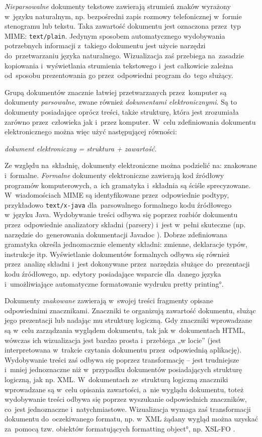 \emph{Nieparsowalne} dokumenty tekstowe zawierają strumień znaków wyrażony w~języku naturalnym, np. bezpośredni zapis rozmowy telefonicznej w~formie stenogramu lub tekstu. Taka zawartość dokumentu jest oznaczona przez~typ MIME: \texttt{text/plain}. Jedynym sposobem automatycznego wydobywania potrzebnych informacji z~takiego dokumentu jest użycie narzędzi do~przetwarzaniu języka naturalnego. Wizualizacja zaś przebiega na~zasadzie kopiowania i~wyświetlania strumienia tekstowego i~jest całkowicie zależna od~sposobu prezentowania go przez~odpowiedni program do~tego służący.

Grupą dokumentów znacznie łatwiej przetwarzanych przez~komputer są dokumenty \emph{parsowalne}, zwane również \emph{dokumentami elektronicznymi}. Są to dokumenty posiadające oprócz treści, także strukturę, która jest zrozumiała zarówno przez~człowieka jak i~przez komputer. W~celu zdefiniowania dokumentu elektronicznego można więc użyć następującej równości:

\begin{center}
\emph{dokument elektroniczny = struktura + zawartość.
}
\end{center}

Ze względu na~składnię, dokumenty elektroniczne można podzielić na: znakowane i~formalne. \emph{Formalne} dokumenty elektroniczne zawierają kod źródłowy programów komputerowych, a~ich gramatyka i~składnia są ściśle sprecyzowane. W~wiadomościach MIME są identyfikowane przez~odpowiednie podtypy, przykładowo \texttt{text/x-java} dla~parsowalnego formalnego kodu źródłowego w~języku Java. Wydobywanie treści odbywa się poprzez rozbiór dokumentu przez~odpowiednie analizatory składni (parsery) i~jest w~pełni skuteczne (np. narzędzie do~generowania dokumentacji Javadoc \cite{JAVADOC}). Dobrze zdefiniowana gramatyka określa jednoznacznie elementy składni: zmienne, deklaracje typów, instrukcje itp. Wyświetlanie dokumentów formalnych odbywa się również przez~analizę składni i~jest dokonywane przez~narzędzia służące do~prezentacji kodu źródłowego, np. edytory posiadające wsparcie dla~danego języka i~umożliwiające automatyczne formatowanie wydruku \ang{pretty printing}.

Dokumenty \emph{znakowane} zawierają w~swojej treści fragmenty opisane odpowiednimi znacznikami. Znaczniki te organizują zawartość dokumentu, służąc jego prezentacji lub nadając mu strukturę logiczną. Gdy znaczniki wprowadzane są w~celu zarządzania wyglądem dokumentu, tak jak w~dokumentach HTML, wówczas ich wizualizacja jest bardzo prosta i~przebiega „w locie” (jest interpretowana w~trakcie czytania dokumentu przez~odpowiednią aplikację). Wydobywanie treści zaś odbywa się poprzez transformację -- jest trudniejsze i~mniej jednoznaczne niż w~przypadku dokumentów posiadających strukturę logiczną, jak np. XML. W~dokumentach ze~strukturą logiczną znaczniki wprowadzane są w~celu opisania zawartości, a~nie wyglądu dokumentu, toteż wydobywanie treści odbywa się poprzez wyszukanie odpowiednich znaczników, co~jest jednoznaczne i~natychmiastowe. Wizualizacja wymaga zaś transformacji dokumentu do~oczekiwanego formatu, np. w~XML żądany wygląd można uzyskać za~pomocą tzw. obiektów formatujących \ang{formatting object}, np. XSL-FO \cite{XSL-FO}.

